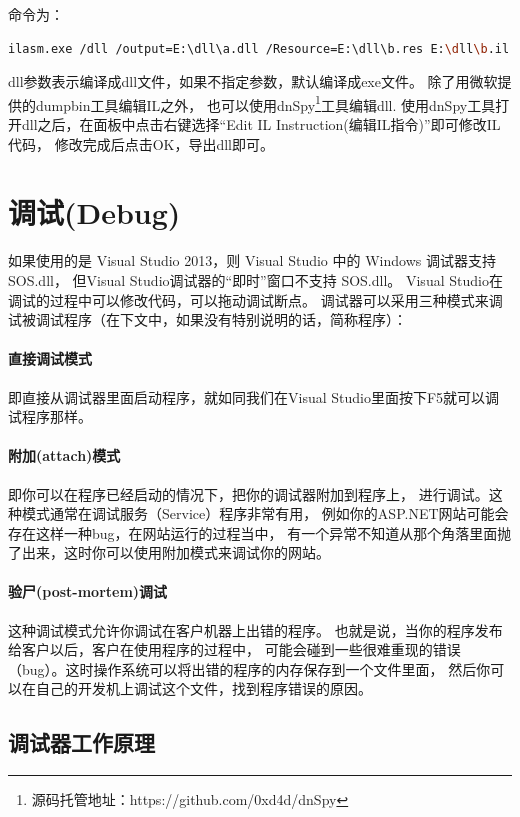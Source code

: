 \documentclass{book}
\begin{document}
命令为：

\begin{lstlisting}[language=Bash]
ilasm.exe /dll /output=E:\dll\a.dll /Resource=E:\dll\b.res E:\dll\b.il
\end{lstlisting}

dll参数表示编译成dll文件，如果不指定参数，默认编译成exe文件。
除了用微软提供的dumpbin工具编辑IL之外，
也可以使用dnSpy\footnote{源码托管地址：https://github.com/0xd4d/dnSpy}工具编辑dll.
使用dnSpy工具打开dll之后，在面板中点击右键选择“Edit IL Instruction(编辑IL指令)”即可修改IL代码，
修改完成后点击OK，导出dll即可。
\section{调试(Debug)}

如果使用的是 Visual Studio 2013，则 Visual Studio 中的 Windows 调试器支持 SOS.dll，
但Visual Studio调试器的“即时”窗口不支持 SOS.dll。
Visual Studio在调试的过程中可以修改代码，可以拖动调试断点。
调试器可以采用三种模式来调试被调试程序（在下文中，如果没有特别说明的话，简称程序）：

\paragraph{直接调试模式}即直接从调试器里面启动程序，就如同我们在Visual Studio里面按下F5就可以调试程序那样。

\paragraph{附加(attach)模式}即你可以在程序已经启动的情况下，把你的调试器附加到程序上，
进行调试。这种模式通常在调试服务（Service）程序非常有用，
例如你的ASP.NET网站可能会存在这样一种bug，在网站运行的过程当中，
有一个异常不知道从那个角落里面抛了出来，这时你可以使用附加模式来调试你的网站。

\paragraph{验尸(post-mortem)调试}这种调试模式允许你调试在客户机器上出错的程序。
也就是说，当你的程序发布给客户以后，客户在使用程序的过程中，
可能会碰到一些很难重现的错误（bug）。这时操作系统可以将出错的程序的内存保存到一个文件里面，
然后你可以在自己的开发机上调试这个文件，找到程序错误的原因。

\subsection{调试器工作原理}
\end{document}
